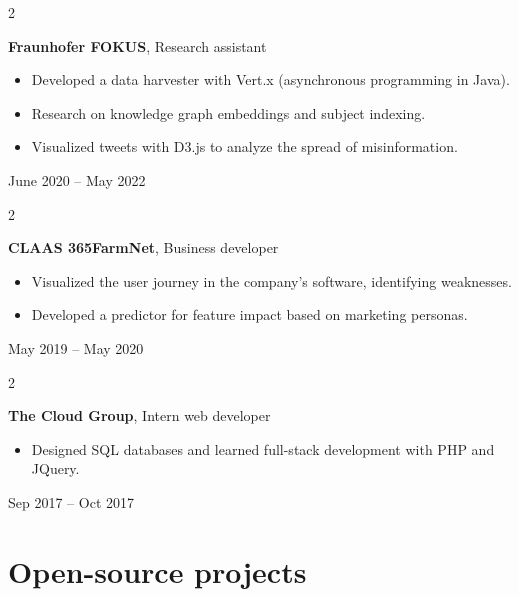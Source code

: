 \documentclass[10pt, letterpaper]{article}
\newenvironment{highlights}{
    \begin{itemize}[
        topsep=0.10 cm,
        parsep=0.10 cm,
        partopsep=0pt,
        itemsep=0pt,
        leftmargin=0.4 cm + 10pt
    ]
}{
    \end{itemize}
} %
\newenvironment{twocolentry}[2][]{
    \onecolentry
    \def\secondColumn{#2}
    \setcolumnwidth{\fill, 4.5 cm}
    \begin{paracol}{2}
}{
    \switchcolumn \raggedleft \secondColumn
    \end{paracol}
    \endonecolentry
} %
\begin{document}
        \begin{twocolentry}{June 2020 – May 2022}
            \textbf{Fraunhofer FOKUS}, Research assistant
            \begin{highlights}
                \item Developed a data harvester with Vert.x (asynchronous programming in Java).
                \item Research on knowledge graph embeddings and subject indexing.
                \item Visualized tweets with D3.js to analyze the spread of misinformation.
            \end{highlights}
        \end{twocolentry}

        \vspace{0.1 cm}

        \begin{twocolentry}{May 2019 – May 2020}
            \textbf{CLAAS 365FarmNet}, Business developer
            \begin{highlights}
                \item Visualized the user journey in the company's software, identifying weaknesses.
                \item Developed a predictor for feature impact based on marketing personas.
            \end{highlights}
        \end{twocolentry}

        \vspace{0.1 cm}

        \begin{samepage}
            \begin{twocolentry}{Sep 2017 – Oct 2017}
                \textbf{The Cloud Group}, Intern web developer
                \begin{highlights}
                    \item Designed SQL databases and learned full-stack development with PHP and JQuery.
                \end{highlights}
            \end{twocolentry}
        \end{samepage}
    
    \section{Open-source projects}
\end{document}
